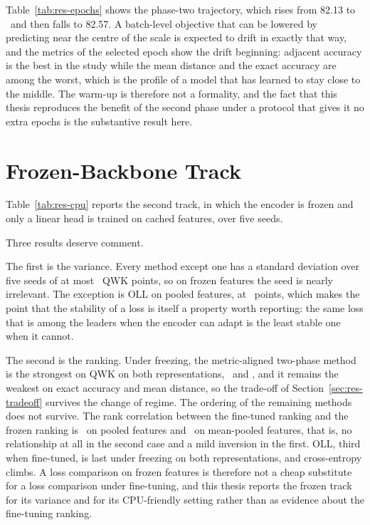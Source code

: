 Table~\ref{tab:res-epochs} shows the phase-two trajectory, which rises from 82.13 to
\devQwkSoftqwk\ and then falls to 82.57. A batch-level objective that can be lowered by
predicting near the centre of the scale is expected to drift in exactly that way, and the
metrics of the selected epoch show the drift beginning: adjacent accuracy is the best in the
study while the mean distance and the exact accuracy are among the worst, which is the profile
of a model that has learned to stay close to the middle. The warm-up is therefore not a
formality, and the fact that this thesis reproduces the benefit of the second phase under a
protocol that gives it no extra epochs is the substantive result here.

\section{Frozen-Backbone Track}
\label{sec:res-frozen}

Table~\ref{tab:res-cpu} reports the second track, in which the encoder is frozen and only a
linear head is trained on cached features, over five seeds.



Three results deserve comment.

The first is the variance. Every method except one has a standard deviation over five seeds of
at most \cpuStdMaxQwk\ QWK points, so on frozen features the seed is nearly irrelevant. The
exception is OLL on pooled features, at \cpuStdOll\ points, which makes the point that the
stability of a loss is itself a property worth reporting: the same loss that is among the
leaders when the encoder can adapt is the least stable one when it cannot.

The second is the ranking. Under freezing, the metric-aligned two-phase method is the strongest
on QWK on both representations, \cpuPoolerdevQwkSoftqwk\ and \cpuMeandevQwkSoftqwk, and it
remains the weakest on exact accuracy and mean distance, so the trade-off of
Section~\ref{sec:res-tradeoff} survives the change of regime. The ordering of the remaining
methods does not survive. The rank correlation between the fine-tuned ranking and the frozen
ranking is \cpuSpearmanPooler\ on pooled features and \cpuSpearmanMean\ on mean-pooled
features, that is, no relationship at all in the second case and a mild inversion in the first.
OLL, third when fine-tuned, is last under freezing on both representations, and cross-entropy
climbs. A loss comparison on frozen features is therefore not a cheap substitute for a loss
comparison under fine-tuning, and this thesis reports the frozen track for its variance and for
its CPU-friendly setting rather than as evidence about the fine-tuning ranking.

